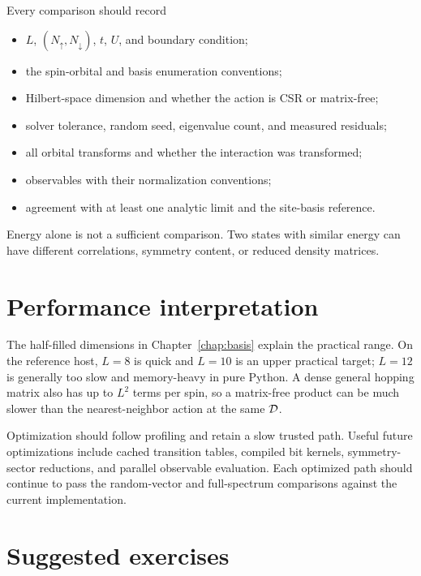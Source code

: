 Every comparison should record
\begin{itemize}
\item $L$, $(N_\uparrow,N_\downarrow)$, $t$, $U$, and boundary condition;
\item the spin-orbital and basis enumeration conventions;
\item Hilbert-space dimension and whether the action is CSR or matrix-free;
\item solver tolerance, random seed, eigenvalue count, and measured residuals;
\item all orbital transforms and whether the interaction was transformed;
\item observables with their normalization conventions;
\item agreement with at least one analytic limit and the site-basis reference.
\end{itemize}
Energy alone is not a sufficient comparison.  Two states with similar energy
can have different correlations, symmetry content, or reduced density
matrices.

\section{Performance interpretation}

The half-filled dimensions in Chapter~\ref{chap:basis} explain the practical
range.  On the reference host, $L=8$ is quick and $L=10$ is an upper practical
target; $L=12$ is generally too slow and memory-heavy in pure Python.  A dense
general hopping matrix also has up to $L^2$ terms per spin, so a matrix-free
product can be much slower than the nearest-neighbor action at the same
$\mathcal{D}$.

Optimization should follow profiling and retain a slow trusted path.  Useful
future optimizations include cached transition tables, compiled bit kernels,
symmetry-sector reductions, and parallel observable evaluation.  Each optimized
path should continue to pass the random-vector and full-spectrum comparisons
against the current implementation.

\section{Suggested exercises}

